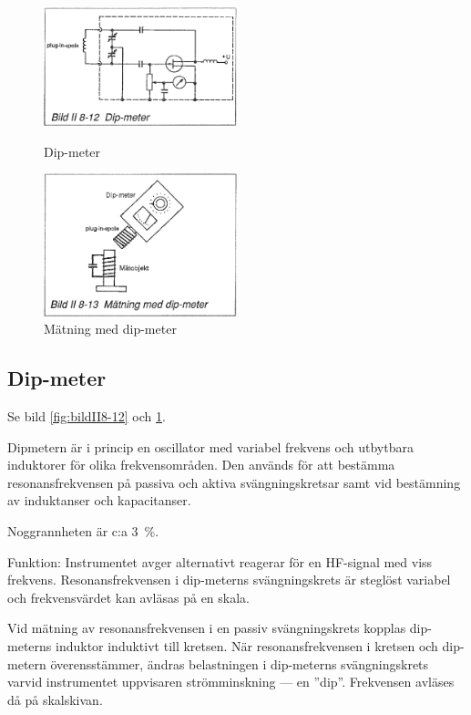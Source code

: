 \begin{figure}
  \includegraphics[width=0.5\textwidth]{images/bild_2_8-12}
  \caption{Dip-meter}
  \label{fig:bildII8-12}

  \includegraphics[width=0.5\textwidth]{images/bild_2_8-13}
  \caption{Mätning med dip-meter}
  \label{fig:bildII8-13}
\end{figure}

\subsection{Dip-meter}

Se bild \ref{fig:bildII8-12} och \ref{fig:bildII8-13}.

Dipmetern är i princip en oscillator med variabel frekvens och
utbytbara induktorer för olika frekvensområden.  Den används för att
bestämma resonansfrekvensen på passiva och aktiva svängningskretsar
samt vid bestämning av induktanser och kapacitanser.

Noggrannheten är c:a 3~\%.

Funktion: Instrumentet avger alternativt reagerar för en HF-signal med
viss frekvens.  Resonansfrekvensen i dip-meterns svängningskrets är
steglöst variabel och frekvensvärdet kan avläsas på en skala.

Vid mätning av resonansfrekvensen i en passiv svängningskrets kopplas
dip-meterns induktor induktivt till kretsen. När resonansfrekvensen i
kretsen och dip-metern överensstämmer, ändras belastningen i
dip-meterns svängningskrets varvid instrumentet uppvisaren
strömminskning --- en ''dip''. Frekvensen avläses då på skalskivan.

